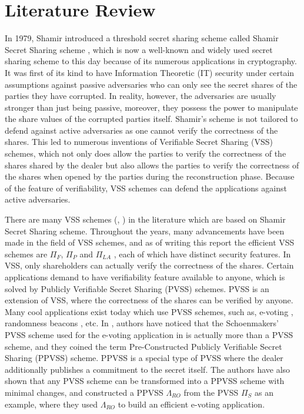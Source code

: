\chapter{Literature Review}
\label{cha:0}
In 1979, Shamir introduced a threshold secret sharing scheme called 
Shamir Secret Sharing scheme \cite{10.1145/359168.359176}, which is now a well-known 
and widely used secret sharing scheme to this day because of its numerous applications in
cryptography. It was first of its kind to have Information Theoretic (IT) security 
under certain assumptions against passive adversaries who can only see the secret 
shares of the parties they have corrupted. In reality, however, the adversaries 
are usually stronger than just being passive, moreover, they possess the power 
to manipulate the share values of the corrupted parties itself. 
Shamir's scheme is not tailored to defend against active adversaries as one cannot 
verify the correctness of the shares. This led to numerous inventions of Verifiable 
Secret Sharing (VSS) schemes, which not only does allow the parties to verify the 
correctness of the shares shared by the dealer but also allows the parties to verify 
the correctness of the shares when opened by the parties during the reconstruction 
phase. Because of the feature of verifiability, VSS schemes can defend the applications 
against active adversaries.\par

There are many VSS schemes (\cite{d053b0be49644b2f932d703db8c1f8a0}, \cite{DBLP:conf/focs/Feldman87}) 
in the literature which are based on Shamir Secret Sharing scheme. Throughout the years, many advancements 
have been made in the field of VSS schemes, and as of writing this report the efficient VSS schemes are 
$\Pi_F$, $\Pi_P$ and $\Pi_{LA}$ \cite{cryptoeprint:2023/1669}, each of which have distinct security features. 
In VSS, only shareholders can actually verify the correctness of the shares. Certain applications demand 
to have verifiability feature available to anyone, which is solved by Publicly Verifiable Secret Sharing (PVSS) 
schemes. PVSS is an extension of VSS, where the correctness of the shares can be verified by anyone. Many 
cool applications exist today which use PVSS schemes, such as, e-voting \cite{5581ccd9530540479539d21d1d39ae96}, 
randomness beacons \cite{cryptoeprint:2017/216}, etc. In \cite{cryptoeprint:2025/576}, authors have noticed 
that the Schoenmakers' PVSS scheme used for the e-voting application in \cite{5581ccd9530540479539d21d1d39ae96} 
is actually more than a PVSS scheme, and they coined the term Pre-Constructed Publicly Verifiable Secret Sharing (PPVSS) scheme. 
PPVSS is a special type of PVSS where the dealer additionally publishes a commitment to the secret itself. 
The authors have also shown that any PVSS scheme can be transformed into a PPVSS scheme with minimal 
changes, and constructed a PPVSS $\Lambda_{RO}$ from the PVSS $\Pi_S$ \cite{cryptoeprint:2023/1669} as an 
example, where they used $\Lambda_{RO}$ to build an efficient e-voting application.\par 

